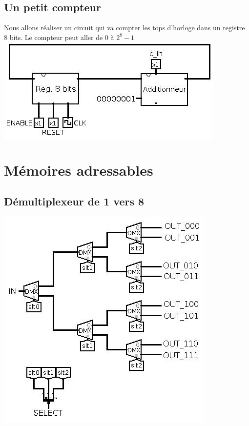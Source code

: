 \documentclass[10pt,a4paper]{article}
\begin{document}
\subsection{Un petit compteur}
Nous allons réaliser un circuit qui va compter les tops d'horloge dans un registre 8 bits. Le compteur peut aller de 0 à $2^{8}-1$\\
\includegraphics[scale=0.7]{Compteur.jpg} 

\section{Mémoires adressables}
\subsection{Démultiplexeur de 1 vers 8}
\includegraphics[scale=0.7]{Demux1vers8.jpg} 
\end{document}
